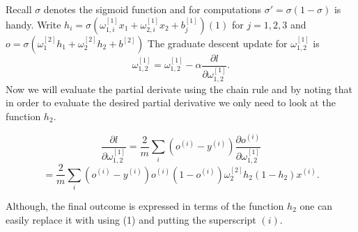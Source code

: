 \begin{answer}
 Recall $\sigma$ denotes the sigmoid function and for computations $\sigma' = \sigma (1 - \sigma)$ is handy.
 Write $h_i = \sigma(\omega _{1,i}^{[1]}x_1 + \omega _{2,i}^{[1]}x_2 + b_j^{[1]}) (1)$ for $j = 1,2 ,3$ and $o = \sigma(\omega _{1}^{[2]}h_1 + \omega _{2}^{[2]}h_2 + b^{[2]})$
The graduate descent update for $\omega _{1,2}^{[1]}$ is
$$\omega _{1,2}^{[1]} = \omega _{1,2}^{[1]} - \alpha \frac{\partial l}{\partial \omega _{1,2}^{[1]}}.$$
Now we  will evaluate the partial derivate using the chain rule and by noting that in order to evaluate the desired partial
derivative we only need to look at the function $h_2.$

$$\frac{\partial l}{\partial \omega _{1,2}^{[1]}}= \frac 2m\sum_{i}(o^{(i)} - y^{(i)})\frac{\partial o^{(i)}}{\partial \omega _{1,2}^{[1]}}$$
$$ = \frac 2m\sum_{i}(o^{(i)} - y^{(i)}) o^{(i)}(1 - o^{(i)})\omega_2^{[2]}h_2(1 - h_2)x^{(i)}.$$ 

Although, the final outcome is expressed in terms of the function $h_2$ one can easily replace it with using (1) and putting the superscript $(i).$      
 \end{answer}
